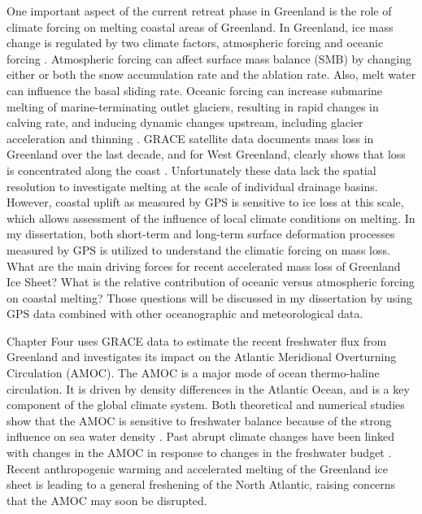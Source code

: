 One important aspect of the current retreat phase in Greenland is the role of climate forcing on melting coastal areas of Greenland.  In Greenland, ice mass change is regulated by two climate factors, atmospheric forcing \cite[]{zwally2002intro,hall2008intro} and oceanic forcing \cite[]{van2008intro,holland2008intro,hanna2009intro,straneo2010intro,straneo2012intro,straneo2013intro,seale2011intro}.  Atmospheric forcing can affect surface mass balance (SMB) by changing either or both the snow accumulation rate and the ablation rate. Also, melt water can influence the basal sliding rate. Oceanic forcing can increase submarine melting of marine-terminating outlet glaciers, resulting in rapid changes in calving rate, and inducing dynamic changes upstream, including glacier acceleration and thinning \cite[]{straneo2013intro}.  GRACE satellite data documents mass loss in Greenland over the last decade, and for West Greenland, clearly shows that loss is concentrated along the coast \cite[e.g.,][]{wouters2008intro}.  Unfortunately these data lack the spatial resolution to investigate melting at the scale of individual drainage basins.  However, coastal uplift as measured by GPS is sensitive to ice loss at this scale, which allows assessment of the influence of local climate conditions on melting.   In my dissertation, both short-term and long-term surface deformation processes measured by GPS is utilized to understand the climatic forcing on mass loss. What are the main driving forces for recent accelerated mass loss of Greenland Ice Sheet?  What is the relative contribution of oceanic versus atmospheric forcing on coastal melting?  Those questions will be discussed in my dissertation by using GPS data combined with other oceanographic and meteorological data.

Chapter Four uses GRACE data to estimate the recent freshwater flux from Greenland and investigates its impact on the Atlantic Meridional Overturning Circulation (AMOC).  The AMOC is a major mode of ocean thermo-haline circulation.  It is driven by density differences in the Atlantic Ocean, and is a key component of the global climate system.  Both theoretical and numerical studies show that the AMOC is sensitive to freshwater balance because of the strong influence on sea water density \cite[]{stommel1961intro,rooth1982intro,rahmstorf1995intro,stouffer2006intro}.  Past abrupt climate changes have been linked with changes in the AMOC in response to changes in the freshwater budget \cite[]{manabe1993intro,manabe1995intro,clark2002intro}.  Recent anthropogenic warming and accelerated melting of the Greenland ice sheet is leading to a general freshening of the North Atlantic, raising concerns that the AMOC may soon be disrupted.  

